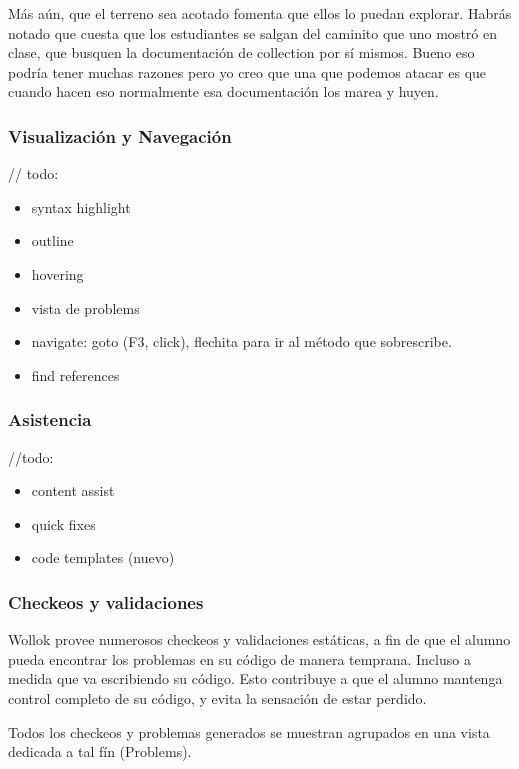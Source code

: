 Más aún, que el terreno sea acotado fomenta que ellos lo puedan explorar. 
Habrás notado que cuesta que los estudiantes se salgan del caminito que uno mostró en clase, que busquen la documentación de collection por sí mismos. Bueno eso podría tener muchas razones pero yo creo que una que podemos atacar es que cuando hacen eso normalmente esa documentación los marea y huyen.


\subsubsection{Visualización y Navegación}

// todo: 
\begin{itemize}
  \item syntax highlight
  \item outline
  \item hovering
  \item vista de problems 
  \item navigate: goto (F3, click), flechita para ir al método que sobrescribe.
  \item find references 
\end{itemize}

\subsubsection{Asistencia}

//todo: 
\begin{itemize}
  \item content assist
  \item quick fixes
  \item code templates (nuevo)
\end{itemize}

\subsubsection{Checkeos y validaciones}

Wollok provee numerosos checkeos y validaciones estáticas, a fin de que el
alumno pueda encontrar los problemas en su código de manera temprana.
Incluso a medida que va escribiendo su código.
Esto contribuye a que el alumno mantenga control completo de su
código, y evita la sensación de estar perdido.
 
Todos los checkeos y problemas
generados se muestran agrupados en una vista dedicada a tal fín (Problems).

